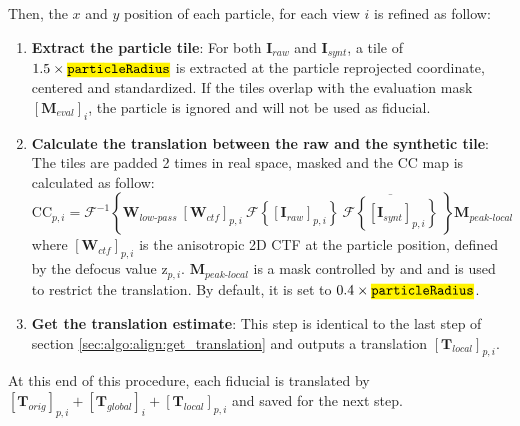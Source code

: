 
Then, the $x$ and $y$ position of each particle, for each view $i$ is refined as follow:
\begin{enumerate}
    \item \textbf{Extract the particle tile}: For both $\bm{I}_{raw}$ and $\bm{I}_{synt}$, a tile of $1.5 \times \code{particleRadius}$ is extracted at the particle reprojected coordinate, centered and standardized. If the tiles overlap with the evaluation mask ${[\bm{M}_{eval}]}_i$, the particle is ignored and will not be used as fiducial.
    
    \item \textbf{Calculate the translation between the raw and the synthetic tile}: The tiles are padded 2 times in real space, masked and the CC map is calculated as follow:
    \begin{equation}
        \bm{\mathrm{CC}}_{p,i} = \mathcal{F}^{-1} \left\{ \bm{W}_{low\text{-}pass}\ {[\bm{W}_{ctf}]}_{p,i}\ \mathcal{F}\left\{ {[\bm{I}_{raw}]}_{p,i} \right\}\ \overline{\mathcal{F}\left\{ {[\bm{I}_{synt}]}_{p,i} \right\}}\ \right\} \bm{M}_{peak\text{-}local}
    \end{equation}
    where ${[\bm{W}_{ctf}]}_{p,i}$ is the anisotropic 2D CTF at the particle position, defined by the defocus value $\bm{\mathrm{z}}_{p,i}$. $\bm{M}_{peak\text{-}local}$ is a mask controlled by  and  and is used to restrict the translation. By default, it is set to $0.4 \times \code{particleRadius}$.
    
    \item \textbf{Get the translation estimate}: This step is identical to the last step of section \ref{sec:algo:align:get_translation} and outputs a translation ${[\bm{T}_{local}]}_{p,i}$.
\end{enumerate}

At this end of this procedure, each fiducial is translated by ${[\bm{T}_{orig}]}_{p,i} + {[\bm{T}_{global}]}_i + {[\bm{T}_{local}]}_{p,i}$ and saved for the next step.

